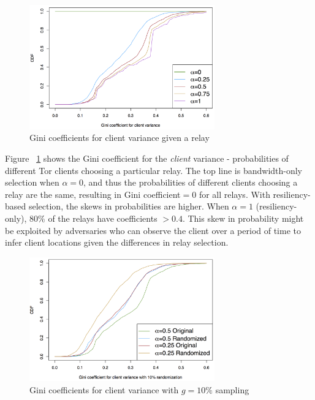 \begin{figure}[ht!]
\centering
\includegraphics[width=80mm]{figure/gini_client_variance}
\caption{Gini coefficients for client variance given a relay \label{fig_gini_client}}
\end{figure}

Figure ~\ref{fig_gini_client} shows the Gini coefficient for the \emph{client} variance - probabilities of different Tor clients choosing a particular relay. The top line is bandwidth-only selection when $\alpha = 0$, and thus the probabilities of different clients choosing a relay are the same, resulting in Gini coefficient$=0$ for all relays. With resiliency-based selection, the skews in probabilities are higher. When $\alpha = 1$ (resiliency-only), $80\%$ of the relays have coefficients $> 0.4$. This skew in probability might be exploited by adversaries who can observe the client over a period of time to infer client locations given the differences in relay selection.

\begin{figure}[ht!]
\centering
\includegraphics[width=80mm]{figure/randomize_client_gini}
\caption{Gini coefficients for client variance with $g=10\%$ sampling \label{fig_gini_client_random}}
\end{figure}

